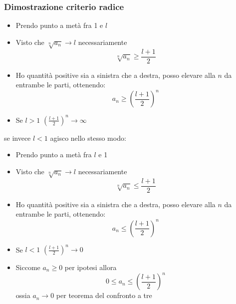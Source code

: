\subsubsection{Dimostrazione criterio radice}
\begin{itemize}
	\item Prendo punto a metà fra 1 e $l$
	\item Visto che $\sqrt[n]{a_n} \to l$ necessariamente
	      \[
		      \sqrt[n]{a_n} \ge \frac{l+1}{2}
	      \]
	\item Ho quantità positive sia a sinistra che a destra, posso elevare alla $n$ da entrambe le parti, ottenendo:
	      \[
		      a_n \ge \left( \frac{l+1}{2} \right) ^{n}
	      \]
	\item Se $l > 1$ $\left( \frac{l+1}{2} \right)^{n}  \to \infty$
\end{itemize}
\hr
se invece $l<1$ agisco nello stesso modo:
\begin{itemize}
	\item Prendo punto a metà fra $l$ e 1
	\item Visto che $\sqrt[n]{a_n} \to l$ necessariamente
	      \[
		      \sqrt[n]{a_n} \le \frac{l+1}{2}
	      \]
	\item Ho quantità positive sia a sinistra che a destra, posso elevare alla $n$ da entrambe le parti, ottenendo:
	      \[
		      a_n \le \left( \frac{l+1}{2} \right) ^{n}
	      \]
	\item Se $l < 1$ $\left( \frac{l+1}{2} \right)^{n}  \to 0$
	\item Siccome $a_n \ge 0$ per ipotesi allora
	      \[
		      0 \le a_n \le \left( \frac{l+1}{2} \right) ^{n}
	      \]
	      ossia $a_n \to 0$ per teorema del confronto a tre
\end{itemize}
